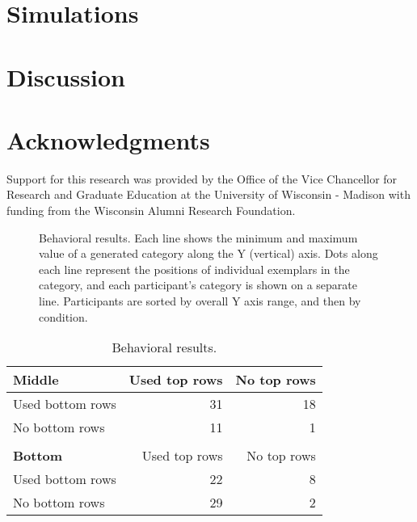\documentclass[10pt,letterpaper]{article}
\begin{document}
\section{Simulations}
\section{Discussion}
\section{Acknowledgments}
Support for this research was provided by the Office of the Vice Chancellor for Research and Graduate Education at the University of Wisconsin - Madison with funding from the Wisconsin Alumni Research Foundation.

\begin{figure*}
    \begin{center}
    
    \caption{Behavioral results. Each line shows the minimum and maximum value of a generated category along the Y (vertical) axis. Dots along each line represent the positions of individual exemplars in the category, and each participant's category is shown on a separate line. Participants are sorted by overall Y axis range, and then by condition.}
    \label{fig:middle-bottom-yranges}
    \end{center}
\end{figure*}

\begin{table}[!ht]
\begin{center} 
\caption{Behavioral results.} 
\label{table:subset-table} 
\vskip 0.12in
\begin{tabular}{ l r r}
    \textbf{Middle}         & Used top rows & No top rows \\
    \hline
    Used bottom rows        &  31 & 18  \\
    No bottom rows          &  11 &  1  \\
    \\
    \textbf{Bottom}         & Used top rows & No top rows \\
    \hline
    Used bottom rows        & 22 & 8 \\
    No bottom rows          & 29 & 2 \\
\end{tabular}
\end{center} 
\end{table}





\setlength{\bibleftmargin}{.025in}
\setlength{\bibindent}{-\bibleftmargin}

\end{document}
